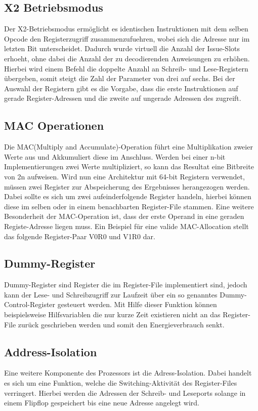 \subsection{X2 Betriebsmodus}\label{subsec:x2Mode}
Der X2-Betriebsmodus ermöglicht es identischen Instruktionen mit dem selben Opcode den Registerzugriff zusammenzufuehren, wobei sich die Adresse nur im letzten Bit unterscheidet. Dadurch wurde virtuell die Anzahl der Issue-Slots erhoeht, ohne dabei die Anzahl der zu decodierenden Anweisungen zu erhöhen. Hierbei wird einem Befehl die doppelte Anzahl an Schreib- und Lese-Registern übergeben, somit steigt die Zahl der Parameter von drei auf sechs. Bei der Auswahl der Registern gibt es die Vorgabe, dass die erste Instruktionen auf gerade Register-Adressen und die zweite auf ungerade Adressen des zugreift. \cite{paya2009instruction}
\subsection{MAC Operationen}\label{subsec:macMode}
Die MAC(Multiply and Accumulate)-Operation führt eine Multiplikation zweier Werte aus und Akkumuliert diese im Anschluss. Werden bei einer n-bit Implementierungen zwei Werte multipliziert, so kann das Resultat eine Bitbreite von 2n aufweisen. Wird nun eine Architektur mit 64-bit Registern verwendet, müssen zwei Register zur Abspeicherung des Ergebnisses herangezogen werden. Dabei sollte es sich um zwei aufeinderfolgende Register handeln, hierbei können diese im selben oder in einem benachbarten Register-File stammen. Eine weitere Besonderheit der MAC-Operation ist, dass der erste Operand in eine geraden Registe-Adresse liegen muss. Ein Beispiel für eine valide MAC-Allocation stellt das folgende Register-Paar V0R0 und V1R0 dar.
  

\subsection{Dummy-Register}\label{subsec:dummy}
Dummy-Register sind Register die im Register-File implementiert sind, jedoch kann der Lese- und Schreibzugriff zur Laufzeit über ein so genanntes Dummy-Control-Register gesteuert werden. Mit Hilfe dieser Funktion können beispielsweise Hilfsvariablen die nur kurze Zeit existieren nicht an das Register-File zurück geschrieben werden und somit den Energieverbrauch senkt. 

\subsection{Address-Isolation}\label{subsec:add_iso}
Eine weitere Komponente des Prozessors ist die Adress-Isolation. Dabei handelt es sich um eine Funktion, welche die Switching-Aktivität des Register-Files verringert. Hierbei werden die Adressen der Schreib- und Leseports solange in einem Flipflop gespeichert bis eine neue Adresse angelegt wird.\cite{lukasglitches2017}

